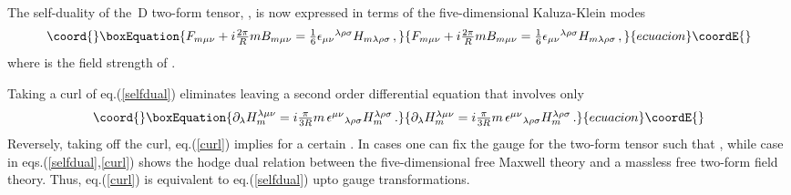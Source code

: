 \documentclass[a4paper,12pt]{article}
\def\pr{{\textstyle{\frac{2\pi}{R}}}}
\begin{document}
The self-duality of the \coordHE{}\,D two-form tensor, \coordHE{}, is now expressed in terms of the five-dimensional Kaluza-Klein  modes
\begin{equation}\coord{}\boxEquation{
F_{m\mu\nu}+i\pr mB_{m\mu\nu}=\textstyle{\frac{1}{6}}\epsilon_{\mu\nu}{}^{\lambda\rho\sigma}H_{m\lambda\rho\sigma}\,,
\label{selfdual}
}{
F_{m\mu\nu}+i\pr mB_{m\mu\nu}=\textstyle{\frac{1}{6}}\epsilon_{\mu\nu}{}^{\lambda\rho\sigma}H_{m\lambda\rho\sigma}\,,
}{ecuacion}\coordE{}\end{equation}
where \coordHE{} is the field strength of \coordHE{}.  \newline



Taking a curl of eq.(\ref{selfdual}) eliminates \coordHE{} leaving a second order  differential equation that involves \coordHE{} only
\begin{equation}\coord{}\boxEquation{
\partial_{\lambda}H_{m}^{\lambda\mu\nu}=i\textstyle{\frac{\pi}{3R}}m\,\epsilon^{\mu\nu}{}_{\lambda\rho\sigma}H_{m}^{\lambda\rho\sigma}\,.
\label{curl}
}{
\partial_{\lambda}H_{m}^{\lambda\mu\nu}=i\textstyle{\frac{\pi}{3R}}m\,\epsilon^{\mu\nu}{}_{\lambda\rho\sigma}H_{m}^{\lambda\rho\sigma}\,.
}{ecuacion}\coordE{}\end{equation}
Reversely,  taking off the curl,   eq.(\ref{curl}) implies  \myHighlight{$\textstyle{\frac{1}{6}}\epsilon_{\mu\nu}{}^{\lambda\rho\sigma}H_{m\lambda\rho\sigma}-i\pr mB_{m\mu\nu}=F_{m\mu\nu}^{\prime}$}\coordHE{} for a certain \coordHE{}. In \coordHE{} cases  one can fix the gauge for the two-form tensor such that  \coordHE{}, while  \coordHE{} case in eqs.(\ref{selfdual},\ref{curl}) shows the hodge dual relation between the five-dimensional free Maxwell theory and a massless free two-form field theory. Thus, eq.(\ref{curl}) is equivalent to eq.(\ref{selfdual}) upto gauge transformations.\newline
\end{document}
